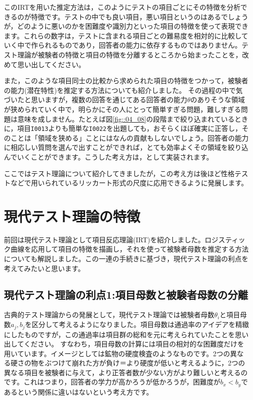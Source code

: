 \documentclass{ltjsbook}
\begin{document}
このIRTを用いた推定方法は，このようにテストの項目ごとにその特徴を分析できるのが特徴です。テストの中でも良い項目，悪い項目というのはあるでしょうが，どのように悪いのかを困難度や識別力といった項目の特徴を使って表現できます。これらの数字は，テストに含まれる項目ごとの難易度を相対的に比較していく中で作られるものであり，回答者の能力に依存するものではありません。テスト理論が被験者の特徴と項目の特徴を分離するところから始まったことを，改めて思い出してください。

また，このような項目同士の比較から求められた項目の特徴をつかって，被験者の能力(潜在特性)を推定する方法についても紹介しました。
その過程の中で気づいたと思いますが，複数の回答を通じてある回答者の能力$\theta$のありそうな領域が狭められていく中で，明らかにその人にとって簡単すぎる問題，難しすぎる問題は意味を成しません。たとえば図\ref{fig::04_08}の段階まで絞り込まれているときに，項目\texttt{I0013}よりも簡単な\texttt{I0022}を出題しても，おそらくほぼ確実に正答し，そのことは「領域を狭める」ことにはなんの貢献もしないでしょう。回答者の能力に相応しい質問を選んで出すことができれば，とても効率よくその領域を絞り込んでいくことができます。こうした考え方は，として実装されます。

ここではテスト理論について紹介してきましたが，この考え方は後ほど性格テストなどで用いられているリッカート形式の尺度に応用できるように発展します。


\section{現代テスト理論の特徴}
前回は現代テスト理論として項目反応理論(IRT)を紹介しました。ロジスティック曲線を応用して項目の特徴を描画し，それを使って被験者母数を推定する方法についても解説しました。この一連の手続きに基づき，現代テスト理論の利点を考えてみたいと思います。
\subsection{現代テスト理論の利点1:項目母数と被験者母数の分離}
古典的テスト理論からの発展として，現代テスト理論では被験者母数$\theta_i$と項目母数$a_j, b_j$を区分して考えるようになりました。項目母数は通過率のアイデアを精緻にしたものですが，この通過率は項目群の総和を元に考えられていたことを思い出してください。
すなわち，項目母数の計算には項目の相対的な困難度だけを用いています。イメージとしては鉱物の硬度検査のようなものです。2つの異なる硬さの物をぶつけて崩れた方が負け＝より硬度が低いと考えるように，2つの異なる項目を被験者に与えて，より正答者数が少ない方がより難しいと考えるのです。これはつまり，回答者の学力が高かろうが低かろうが，困難度が$b_x < b_y$であるという関係に違いはないという考え方です。
\end{document}

